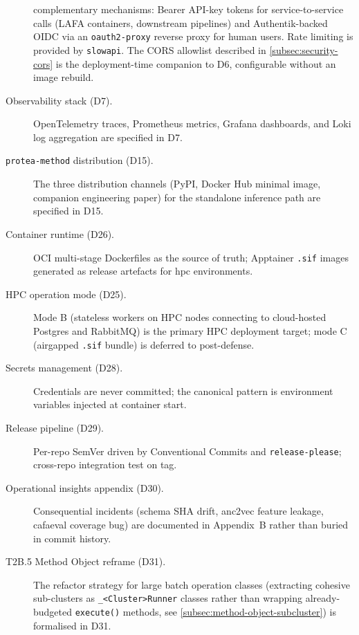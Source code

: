 \begin{description}
    complementary mechanisms: Bearer API-key tokens for service-to-service calls
    (LAFA containers, downstream pipelines) and Authentik-backed OIDC via an
    \texttt{oauth2-proxy} reverse proxy for human users. Rate limiting is
    provided by \texttt{slowapi}. The CORS allowlist described in
    \cref{subsec:security-cors} is the deployment-time companion to D6,
    configurable without an image rebuild.
  \item[Observability stack (D7).] OpenTelemetry traces, Prometheus metrics,
    Grafana dashboards, and Loki log aggregation are specified in D7.
  \item[\texttt{protea-method} distribution (D15).] The three distribution
    channels (PyPI, Docker Hub minimal image, companion engineering paper)
    for the standalone inference path are specified in D15.
  \item[Container runtime (D26).] OCI multi-stage Dockerfiles as the source
    of truth; Apptainer \texttt{.sif} images generated as release artefacts
    for \gls{hpc} environments.
  \item[HPC operation mode (D25).] Mode B (stateless workers on HPC nodes
    connecting to cloud-hosted Postgres and RabbitMQ) is the primary HPC
    deployment target; mode C (airgapped \texttt{.sif} bundle) is deferred
    to post-defense.
  \item[Secrets management (D28).] Credentials are never committed; the
    canonical pattern is environment variables injected at container start.
  \item[Release pipeline (D29).] Per-repo SemVer driven by Conventional
    Commits and \texttt{release-please}; cross-repo integration test on tag.
  \item[Operational insights appendix (D30).] Consequential incidents
    (schema SHA drift, anc2vec feature leakage, cafaeval coverage bug) are
    documented in Appendix~B rather than buried in commit history.
  \item[T2B.5 Method Object reframe (D31).] The refactor strategy for large
    batch operation classes (extracting cohesive sub-clusters as
    \texttt{\_<Cluster>Runner} classes rather than wrapping already-budgeted
    \texttt{execute()} methods, see \cref{subsec:method-object-subcluster})
    is formalised in D31.
\end{description}

